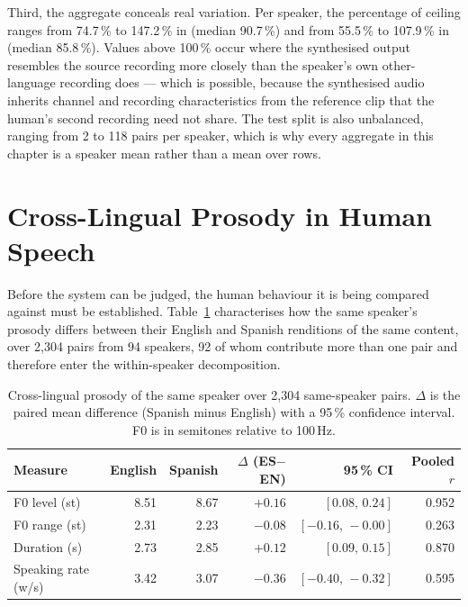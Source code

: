 Third, the aggregate conceals real variation. Per speaker, the percentage of ceiling ranges from
74.7\,\% to 147.2\,\% in \ento{} (median 90.7\,\%) and from 55.5\,\% to 107.9\,\% in \esto{}
(median 85.8\,\%). Values above 100\,\% occur where the synthesised output resembles the source
recording more closely than the speaker's own other-language recording does --- which is possible,
because the synthesised audio inherits channel and recording characteristics from the reference
clip that the human's second recording need not share. The test split is also unbalanced, ranging
from 2 to 118 pairs per speaker, which is why every aggregate in this chapter is a speaker mean
rather than a mean over rows.

\section{Cross-Lingual Prosody in Human Speech}
\label{sec:corpus_result}

Before the system can be judged, the human behaviour it is being compared against must be
established. Table~\ref{tab:corpusprosody} characterises how the same speaker's prosody differs
between their English and Spanish renditions of the same content, over 2{,}304 pairs from 94
speakers, 92 of whom contribute more than one pair and therefore enter the within-speaker
decomposition.

\begin{table}[htbp]
\caption{Cross-lingual prosody of the same speaker over 2{,}304 same-speaker pairs. $\Delta$ is the
paired mean difference (Spanish minus English) with a 95\,\% confidence interval. F0 is in
semitones relative to 100\,Hz.}
\label{tab:corpusprosody}
\centering
{\singlespacing\small
\begin{tabular}{@{}lrrrrr@{}}
\toprule
\textbf{Measure} & \textbf{English} & \textbf{Spanish} & \textbf{$\Delta$ (ES$-$EN)} &
\textbf{95\,\% CI} & \textbf{Pooled $r$} \\
\midrule
F0 level (st)        & 8.51 & 8.67 & $+0.16$ & $[0.08,\,0.24]$ & 0.952 \\
F0 range (st)        & 2.31 & 2.23 & $-0.08$ & $[-0.16,\,-0.00]$ & 0.263 \\
Duration (s)         & 2.73 & 2.85 & $+0.12$ & $[0.09,\,0.15]$ & 0.870 \\
Speaking rate (w/s)  & 3.42 & 3.07 & $-0.36$ & $[-0.40,\,-0.32]$ & 0.595 \\
\bottomrule
\end{tabular}\par}
\end{table}

